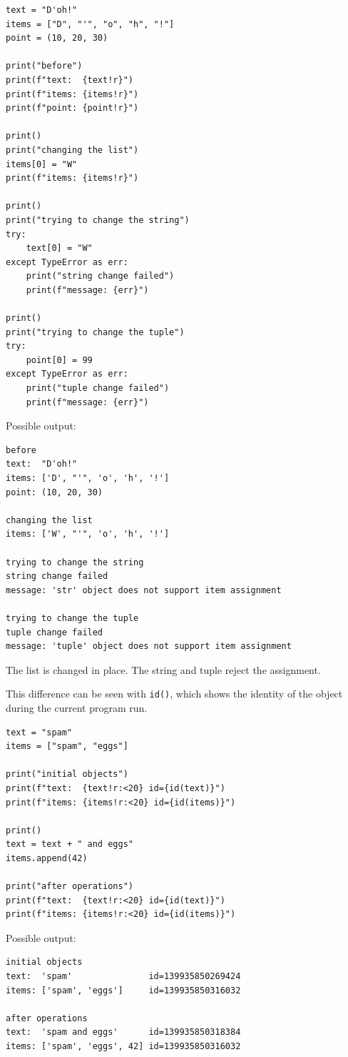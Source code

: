 \begin{verbatim}
text = "D'oh!"
items = ["D", "'", "o", "h", "!"]
point = (10, 20, 30)

print("before")
print(f"text:  {text!r}")
print(f"items: {items!r}")
print(f"point: {point!r}")

print()
print("changing the list")
items[0] = "W"
print(f"items: {items!r}")

print()
print("trying to change the string")
try:
    text[0] = "W"
except TypeError as err:
    print("string change failed")
    print(f"message: {err}")

print()
print("trying to change the tuple")
try:
    point[0] = 99
except TypeError as err:
    print("tuple change failed")
    print(f"message: {err}")
\end{verbatim}

Possible output:

\begin{verbatim}
before
text:  "D'oh!"
items: ['D', "'", 'o', 'h', '!']
point: (10, 20, 30)

changing the list
items: ['W', "'", 'o', 'h', '!']

trying to change the string
string change failed
message: 'str' object does not support item assignment

trying to change the tuple
tuple change failed
message: 'tuple' object does not support item assignment
\end{verbatim}

The list is changed in place. The string and tuple reject the assignment.

This difference can be seen with \texttt{id()}, which shows the identity of the object during the current program run.

\begin{verbatim}
text = "spam"
items = ["spam", "eggs"]

print("initial objects")
print(f"text:  {text!r:<20} id={id(text)}")
print(f"items: {items!r:<20} id={id(items)}")

print()
text = text + " and eggs"
items.append(42)

print("after operations")
print(f"text:  {text!r:<20} id={id(text)}")
print(f"items: {items!r:<20} id={id(items)}")
\end{verbatim}

Possible output:

\begin{verbatim}
initial objects
text:  'spam'               id=139935850269424
items: ['spam', 'eggs']     id=139935850316032

after operations
text:  'spam and eggs'      id=139935850318384
items: ['spam', 'eggs', 42] id=139935850316032
\end{verbatim}

